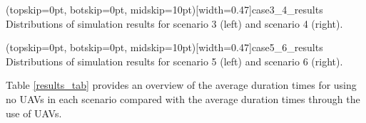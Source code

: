 \documentclass{ieeeaccess}
\begin{document}
\Figure[t!](topskip=0pt, botskip=0pt, midskip=10pt)[width=0.47\textwidth]{case3_4_results}
{Distributions of simulation results for scenario 3 (left) and scenario 4 (right).\label{fig:sub2}}

\Figure[t!](topskip=0pt, botskip=0pt, midskip=10pt)[width=0.47\textwidth]{case5_6_results}
{Distributions of simulation results for scenario 5 (left) and scenario 6 (right).\label{fig:sub3}}


Table \ref{results_tab} provides an overview of the average duration times for using no UAVs in each scenario compared with the average duration times through the use of UAVs.
\end{document}
